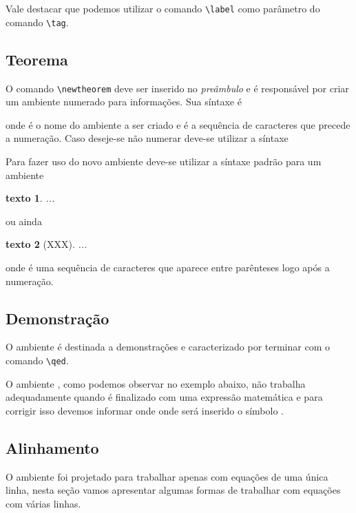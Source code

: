 Vale destacar que podemos utilizar o comando \lstinline!\label! como parâmetro do comando \lstinline!\tag!.

\subsection{Teorema}
O comando \lstinline{\newtheorem} deve ser inserido no \textit{preâmbulo} e é responsável por criar um ambiente numerado para informações. Sua síntaxe é
\begin{code}
\newtheorem{nome}{texto}
\end{code}
onde  é o nome do ambiente a ser criado e  é a sequência de caracteres que precede a numeração. Caso deseje-se não numerar deve-se utilizar a síntaxe
\begin{code}
\newtheorem*{nome}{texto}
\end{code}

Para fazer uso do novo ambiente deve-se utilizar a síntaxe padrão para um ambiente
\begin{code}
\begin{nome}
    ...
\end{nome}
\end{code}
ou ainda
\begin{code}
\begin{nome}[XXX]
    ...
\end{nome}
\end{code}
onde  é uma sequ\^{e}ncia de caracteres que aparece entre parênteses logo após a numeração.

\subsection{Demonstra\c{c}\~{a}o}
O ambiente  é destinada a demonstrações e caracterizado por terminar com o comando \lstinline!\qed!. \\

O ambiente , como podemos observar no exemplo abaixo, não trabalha adequadamente quando é finalizado com uma expressão matemática  e para corrigir isso devemos informar onde onde ser\'{a} inserido o s\'{i}mbolo . \\

\subsection{Alinhamento}
O ambiente  foi projetado para trabalhar apenas com equações de uma única linha, nesta seção vamos apresentar algumas formas de trabalhar com equações com várias linhas.

